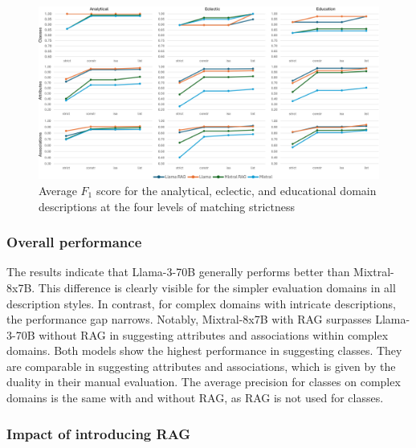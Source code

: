 \begin{figure}[!h]
    \centering
    \includegraphics[scale=0.10]{img/evaluation-simple-f1.png}
    \caption{\centering Average $F_1$ score for the analytical, eclectic, and educational domain descriptions at the four levels of matching strictness}
    \label{fig:evaluation-simple-f1}
\end{figure}


\subsubsection{Overall performance}

The results indicate that Llama-3-70B generally performs better than Mixtral-8x7B.
This difference is clearly visible for the simpler evaluation domains in all description styles.
In contrast, for complex domains with intricate descriptions, the performance gap narrows.
Notably, Mixtral-8x7B with RAG surpasses Llama-3-70B without RAG in suggesting attributes and associations within complex domains.
Both models show the highest performance in suggesting classes.
They are comparable in suggesting attributes and associations, which is given by the duality in their manual evaluation.
The average precision for classes on complex domains is the same with and without RAG, as RAG is not used for classes.


\subsubsection{Impact of introducing RAG}

